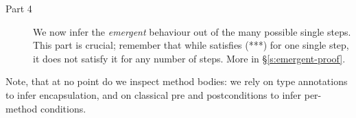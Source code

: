 \begin{description}
\item[Part 4]
  
We now infer the \emph{emergent} behaviour out of the many possible 
single steps.  This part is crucial;   remember that while  satisfies  
(***) for one single step, it does not satisfy it for any number of steps. More in \S\ref{s:emergent-proof}.
 
\end{description} 

\noindent
Note, that at no point do we inspect method bodies: we rely on type annotations
 to infer encapsulation, and on classical pre and postconditions to infer per-method conditions.

